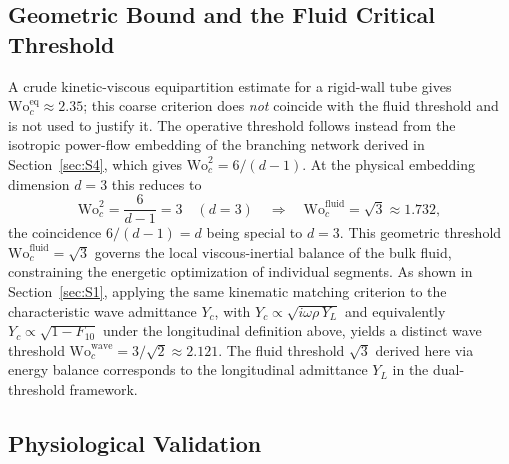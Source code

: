 \documentclass[11pt,a4paper]{article}
\theoremstyle{remark}
\begin{document}
\subsection{Geometric Bound and the Fluid Critical Threshold}

A crude kinetic-viscous equipartition estimate for a rigid-wall tube gives
$\mathrm{Wo}_c^{\mathrm{eq}} \approx 2.35$; this coarse criterion does
\emph{not} coincide with the fluid threshold and is not used to justify it. The
operative threshold follows instead from the isotropic power-flow embedding of
the branching network derived in Section~\ref{sec:S4}, which gives
$\mathrm{Wo}_c^2 = 6/(d-1)$. At the physical embedding dimension $d=3$ this
reduces to
\begin{equation}
    \mathrm{Wo}_c^2 = \frac{6}{d-1} = 3 \quad (d=3)
    \quad \Rightarrow \quad
    \boxed{\mathrm{Wo}_c^{\mathrm{fluid}} = \sqrt{3} \approx 1.732,}
\end{equation}
the coincidence $6/(d-1)=d$ being special to $d=3$. This geometric
threshold $\mathrm{Wo}_c^{\mathrm{fluid}} = \sqrt{3}$ governs the local
viscous-inertial balance of the bulk fluid, constraining the energetic
optimization of individual segments. As shown in Section~\ref{sec:S1}, applying
the same kinematic matching criterion to the characteristic wave admittance
$Y_c$, with $Y_c \propto \sqrt{i\omega\rho\,Y_L}$ and equivalently
$Y_c\propto\sqrt{1-F_{10}}$ under the longitudinal definition above, yields a
distinct wave threshold $\mathrm{Wo}_c^{\mathrm{wave}} = 3/\sqrt{2} \approx
2.121$. The fluid threshold $\sqrt{3}$ derived here via energy balance
corresponds to the longitudinal admittance $Y_L$ in the dual-threshold
framework.

\subsection{Physiological Validation}
\end{document}
